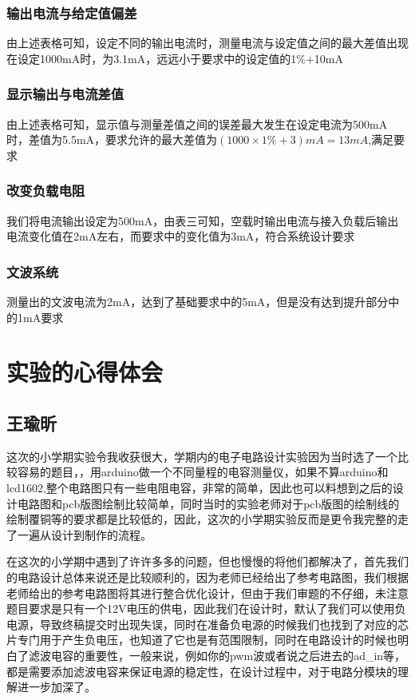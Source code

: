 \documentclass{../source/zjureport}
\begin{document}
            \subsubsection{输出电流与给定值偏差}
            由上述表格可知，设定不同的输出电流时，测量电流与设定值之间的最大差值出现在设定1000mA时，为3.1mA，远远小于要求中的设定值的1\%+10mA
            \subsubsection{显示输出与电流差值}
            由上述表格可知，显示值与测量差值之间的误差最大发生在设定电流为500mA时，差值为5.5mA，要求允许的最大差值为$(1000\times 1\%+3)mA = 13mA$,满足要求
            \subsubsection{改变负载电阻}
            我们将电流输出设定为500mA，由表三可知，空载时输出电流与接入负载后输出电流变化值在2mA左右，而要求中的变化值为3mA，符合系统设计要求
            \subsubsection{文波系统}
            测量出的文波电流为2mA，达到了基础要求中的5mA，但是没有达到提升部分中的1mA要求

            \newpage
        
    \section{实验的心得体会}
        \subsection{王瑜昕}
        这次的小学期实验令我收获很大，学期内的电子电路设计实验因为当时选了一个比较容易的题目，，用arduino做一个不同量程的电容测量仪，如果不算arduino和lcd1602,整个电路图只有一些电阻电容，非常的简单，因此也可以料想到之后的设计电路图和pcb版图绘制比较简单，同时当时的实验老师对于pcb版图的绘制线的绘制覆铜等的要求都是比较低的，因此，这次的小学期实验反而是更令我完整的走了一遍从设计到制作的流程。

        在这次的小学期中遇到了许许多多的问题，但也慢慢的将他们都解决了，首先我们的电路设计总体来说还是比较顺利的，因为老师已经给出了参考电路图，我们根据老师给出的参考电路图将其进行整合优化设计，但由于我们审题的不仔细，未注意题目要求是只有一个12V电压的供电，因此我们在设计时，默认了我们可以使用负电源，导致终稿提交时出现失误，同时在准备负电源的时候我们也找到了对应的芯片专门用于产生负电压，也知道了它也是有范围限制，同时在电路设计的时候也明白了滤波电容的重要性，一般来说，例如你的pwm波或者说之后进去的ad_in等，都是需要添加滤波电容来保证电源的稳定性，在设计过程中，对于电路分模块的理解进一步加深了。
\end{document}

